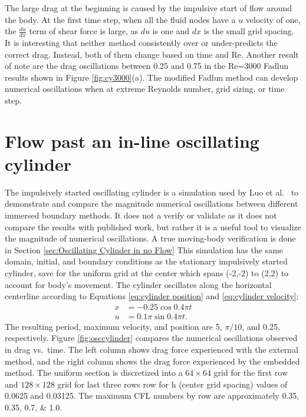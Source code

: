 The large drag at the beginning is caused by the impulsive start of flow around the body. 
At the first time step, when all the fluid nodes have a $u$ velocity of one, the $\frac{du}{dx}$ term of shear force is large, as $du$ is one and $dx$ is the small grid spacing. 
It is interesting that neither method consistently over or under-predicts the correct drag. 
Instead, both of them change based on time and Re. 
Another result of note are the drag oscillations between 0.25 and 0.75 in the Re=3000 Fadlun results shown in Figure \ref{fig:cy3000}(a). 
The modified Fadlun method can develop numerical oscillations when at extreme Reynolds number, grid sizing, or time step. 

\section{Flow past an in-line oscillating cylinder}
\label{sec:osccylinder}
The impulsively started oscillating cylinder is a simulation used by Luo et al.~\cite{Luo:2012gx} to demonstrate and compare the magnitude numerical oscillations between different immersed boundary methods. 
It does not a verify or validate as it does not compare the results with published work, but rather it is a useful tool to visualize the magnitude of numerical oscillations.
A true moving-body verification is done in Section \ref{sec:Oscillating Cylinder in no Flow}
This simulation has the same domain, initial, and boundary conditions as the stationary impulsively started cylinder, save for the uniform grid at the center which spans (-2,-2) to (2,2) to account for body's movement.
The cylinder oscillates along the horizontal centerline according to Equations \eqref{eq:cylinder position} and \eqref{eq:cylinder velocity}:
\begin{align}
x&=-0.25\cos{0.4\pi t}\label{eq:cylinder position}\\
u&=0.1\pi\sin{0.4\pi t}.\;\label{eq:cylinder velocity}
\end{align}
The resulting period, maximum velocity, and position are 5, $\pi/10$, and 0.25, respectively. 
Figure \ref{fig:osccylinder} compares the numerical oscillations observed in drag vs.~time. 
The left column shows drag force experienced with the external method, and the right column shows the drag force experienced by the embedded method.
The uniform section is discretized into a $64 \times 64$ grid for the first row and $ 128 \times 128$ grid for last three rows row for h (center grid spacing) values of 0.0625 and 0.03125. 
The maximum CFL numbers by row are approximately \numlist{0.35; 0.35; 0.7; 1.0}.
